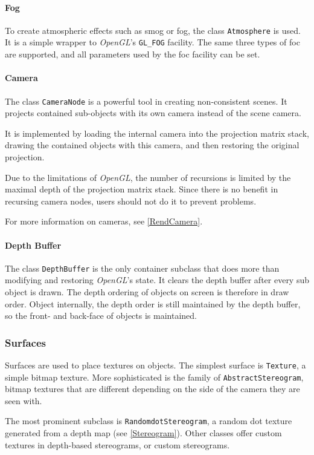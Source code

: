 \paragraph{Fog}
To create atmospheric effects such as smog or fog, the class \lstinline{Atmosphere} is used.
It is a simple wrapper to \textit{OpenGL}'s \lstinline{GL_FOG} facility.
The same three types of foc are supported, and all parameters used by the foc facility can be set.

\paragraph{Camera}
The class \lstinline{CameraNode} is a powerful tool in creating non-consistent scenes.
It projects contained sub-objects with its own camera instead of the scene camera.

It is implemented by loading the internal camera into the projection matrix stack, drawing the contained objects with this camera, and then restoring the original projection.

Due to the limitations of \textit{OpenGL}, the number of recursions is limited by the maximal depth of the projection matrix stack.
Since there is no benefit in recursing camera nodes, users should not do it to prevent problems.

For more information on cameras, see \ref{RendCamera}.

\paragraph{Depth Buffer}
The class \lstinline{DepthBuffer} is the only container subclass that does more than modifying and restoring \textit{OpenGL}'s state.
It clears the depth buffer after every sub object is drawn.
The depth ordering of objects on screen is therefore in draw order.
Object internally, the depth order is still maintained by the depth buffer, so the front- and back-face of objects is maintained.


\subsubsection{Surfaces}
Surfaces are used to place textures on objects.
The simplest surface is \lstinline{Texture}, a simple bitmap texture.
More sophisticated is the family of \lstinline{AbstractStereogram}, bitmap textures that are different depending on the side of the camera they are seen with.

The most prominent subclass is \lstinline{RandomdotStereogram}, a random dot texture generated from a depth map (see \ref{Stereogram}).
Other classes offer custom textures in depth-based stereograms, or custom stereograms.

